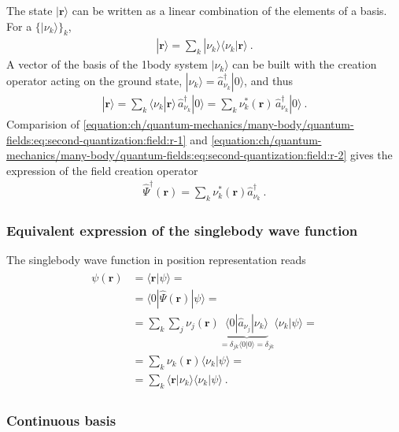 \documentclass[letterpaper,10pt,english]{jupyterBook}
\begin{document}
\sphinxAtStartPar
The state \(| \mathbf{r} \rangle\) can be written as a linear combination of the elements of a basis. For a  \(\{ | \nu_k \rangle \}_k\),
\begin{equation*}
\begin{split}| \mathbf{r} \rangle = \sum_k | \nu_k \rangle \langle \nu_k | \mathbf{r} \rangle \ .\end{split}
\end{equation*}
\sphinxAtStartPar
A vector of the basis of the 1\sphinxhyphen{}body system \(| \nu_k \rangle\) can be built with the creation operator acting on the ground state, \(| \nu_k \rangle = \hat{a}^\dagger_{\nu_k} | 0 \rangle\), and thus
\begin{equation}\label{equation:ch/quantum-mechanics/many-body/quantum-fields:eq:second-quantization:field:r-2}
\begin{split}| \mathbf{r} \rangle = \sum_k \langle \nu_k | \mathbf{r} \rangle \, \hat{a}_{\nu_k}^\dagger | 0 \rangle = \sum_k \nu_k^*(\mathbf{r}) \, \hat{a}_{\nu_k}^\dagger | 0 \rangle \ .\end{split}
\end{equation}
\sphinxAtStartPar
Comparision of \eqref{equation:ch/quantum-mechanics/many-body/quantum-fields:eq:second-quantization:field:r-1} and \eqref{equation:ch/quantum-mechanics/many-body/quantum-fields:eq:second-quantization:field:r-2} gives the expression of the field creation operator
\begin{equation*}
\begin{split}\hat{\Psi}^\dagger(\mathbf{r}) = \sum_k \nu_k^*(\mathbf{r}) \hat{a}_{\nu_k}^\dagger \ .\end{split}
\end{equation*}\subsubsection*{Equivalent expression of the single\sphinxhyphen{}body wave function}

\sphinxAtStartPar
The single\sphinxhyphen{}body wave function in position representation reads
\begin{equation*}
\begin{split}\begin{aligned}
  \psi(\mathbf{r}) 
  & = \langle \mathbf{r} | \psi \rangle = \\
  & = \langle 0 | \hat{\Psi}(\mathbf{r}) | \psi \rangle = \\
  & = \sum_k \sum_j \nu_j(\mathbf{r}) \underbrace{\langle 0 | \hat{a}_{\nu_j} | \nu_k \rangle}_{=\delta_{jk} \langle 0 | 0 \rangle = \delta_{jk}} \langle \nu_k | \psi \rangle = \\
  & = \sum_k \nu_k(\mathbf{r}) \langle \nu_k | \psi \rangle = \\ 
  & = \sum_k \langle \mathbf{r} | \nu_k \rangle \langle \nu_k | \psi \rangle \ .
\end{aligned}\end{split}
\end{equation*}\subsubsection*{Continuous basis}
\end{document}
